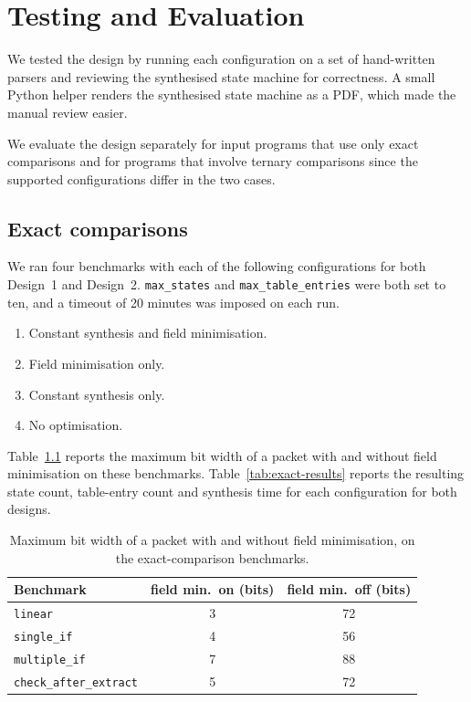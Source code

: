 \chapter{Testing and Evaluation}
\label{ch:testing-evaluation}

We tested the design by running each configuration on a set of
hand-written parsers and reviewing the synthesised state machine for
correctness. A small Python helper renders the synthesised state
machine as a PDF, which made the manual review easier.

We evaluate the design separately for input programs that use only
exact comparisons and for programs that involve ternary
comparisons since the supported configurations differ in the two
cases. 

\section{Exact comparisons}
\label{sec:eval-exact}

We ran four benchmarks with each of the following configurations
for both Design~1 and Design~2. \texttt{max\_states} and
\texttt{max\_table\_entries} were both set to ten, and a timeout of
20 minutes was imposed on each run.

\begin{enumerate}
    \item Constant synthesis and field minimisation.
    \item Field minimisation only.
    \item Constant synthesis only.
    \item No optimisation.
\end{enumerate}

Table~\ref{tab:eval-exact-fieldsizes} reports the maximum bit width
of a packet with and without field minimisation on these benchmarks.
Table~\ref{tab:exact-results} reports the resulting state count,
table-entry count and synthesis time for each configuration for
both designs.

\begin{table}[H]
\centering
{}
\begin{tabular}{lcc}
\hline
\rowcolor{blue!20}
\textbf{Benchmark} & \textbf{field min.\ on (bits)} & \textbf{field min.\ off (bits)} \\
\hline
\texttt{linear}                & 3 & 72  \\
\texttt{single\_if}            & 4 & 56  \\
\texttt{multiple\_if}          & 7 & 88  \\
\texttt{check\_after\_extract} & 5 & 72  \\
\hline
\end{tabular}
\caption{Maximum bit width of a packet with and without
field minimisation, on the exact-comparison benchmarks.}
\label{tab:eval-exact-fieldsizes}
\end{table}

